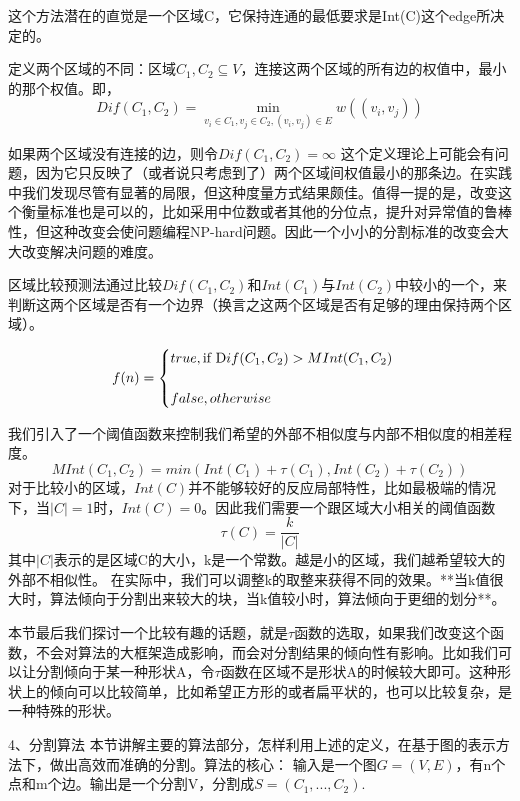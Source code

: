 这个方法潜在的直觉是一个区域C，它保持连通的最低要求是Int(C)这个edge所决定的。

定义两个区域的不同：区域\(C_1,C_2 \subseteq V\)，连接这两个区域的所有边的权值中，最小的那个权值。即，
\begin{equation}
Dif(C_1,C_2) = \mathop {\min }\limits_{v_i \in C_1 ,v_j \in C_2, (v_i,v_j) \in E}w((v_i,v_j))
\end{equation}

如果两个区域没有连接的边，则令\(Dif(C_1,C_2) = \infty\)
这个定义理论上可能会有问题，因为它只反映了（或者说只考虑到了）两个区域间权值最小的那条边。在实践中我们发现尽管有显著的局限，但这种度量方式结果颇佳。值得一提的是，改变这个衡量标准也是可以的，比如采用中位数或者其他的分位点，提升对异常值的鲁棒性，但这种改变会使问题编程NP-hard问题。因此一个小小的分割标准的改变会大大改变解决问题的难度。

区域比较预测法通过比较\(Dif(C_1,C_2)\)和\(Int(C_1)\)与\(Int(C_2)\)中较小的一个，来判断这两个区域是否有一个边界（换言之这两个区域是否有足够的理由保持两个区域）。

\begin{equation}
f(n) =\begin{cases} 
true,   \mbox {if } \mbox Dif(C_1,C_2) > M Int(C_1,C_2)\\\\
false,  otherwise \end{cases}
\end{equation}

我们引入了一个阈值函数来控制我们希望的外部不相似度与内部不相似度的相差程度。
\begin{equation}
MInt(C_1,C_2) = min(Int(C_1) + \tau(C_1),Int(C_2) + \tau(C_2))
\end{equation}
对于比较小的区域，\(Int(C)\)并不能够较好的反应局部特性，比如最极端的情况下，当\(|C| = 1\)时，\(Int(C) = 0\)。因此我们需要一个跟区域大小相关的阈值函数
\[\tau (C) = \frac{k}{|C|}\]
其中\(|C|\)表示的是区域C的大小，k是一个常数。越是小的区域，我们越希望较大的外部不相似性。
在实际中，我们可以调整k的取整来获得不同的效果。**当k值很大时，算法倾向于分割出来较大的块，当k值较小时，算法倾向于更细的划分**。

本节最后我们探讨一个比较有趣的话题，就是\(\tau\)函数的选取，如果我们改变这个函数，不会对算法的大框架造成影响，而会对分割结果的倾向性有影响。比如我们可以让分割倾向于某一种形状A，令\(\tau\)函数在区域不是形状A的时候较大即可。这种形状上的倾向可以比较简单，比如希望正方形的或者扁平状的，也可以比较复杂，是一种特殊的形状。

4、分割算法
本节讲解主要的算法部分，怎样利用上述的定义，在基于图的表示方法下，做出高效而准确的分割。算法的核心：
输入是一个图\(G=(V,E)\)，有n个点和m个边。输出是一个分割V，分割成\(S=(C_1,...,C_2).\)

